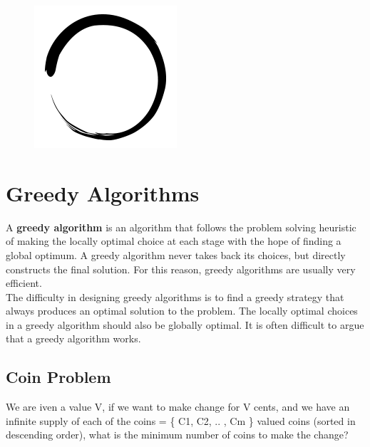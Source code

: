 \documentclass[12pt]{article}
\title{\vspace{-2em}\mytitle\vspace{-0.3em}}
\author{
	\textbf{Editor}\\
	Halil Çetiner  \\ \ \\ 
	\textbf{Reviewer(s)} \\ 
	Onur Yıldız
}
\date{}
\begin{document}
	
	\begin{figure}
		\centering
		\includegraphics[width=\linewidth/4]{inzva-logo.png}
		\label{fig:inzva}
	\end{figure}
	\maketitle
	
	\cleardoublepage
	\tableofcontents
	\cleardoublepage
	\section{Greedy Algorithms}
	A \textbf{greedy algorithm} is an algorithm that follows the problem solving heuristic of making the locally optimal choice at each stage with the hope of finding a global optimum. A greedy algorithm never takes back its choices, but directly constructs the final solution. For this reason, greedy algorithms are usually very efficient.\\
    The difficulty in designing greedy algorithms is to find a greedy strategy that always produces an optimal solution to the problem. The locally optimal choices in a greedy algorithm should also be globally optimal. It is often difficult to argue that a greedy algorithm works.
	\subsection{Coin Problem}
	We are iven a value V, if we want to make change for V cents, and we have an infinite supply of each of the coins = \{ C1, C2, .. , Cm \} valued coins (sorted in descending order), what is the minimum number of coins to make the change?
\end{document}
